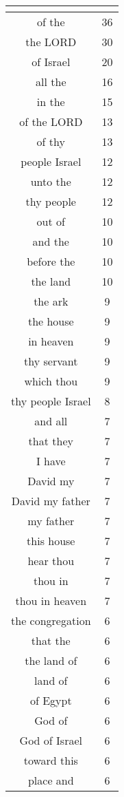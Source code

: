 \begin{center}
\begin{longtable}{|c|c|}
\hline \multicolumn{2}{c}{{ }} \\ \hline
\endfoot 
of the & 36\\ \hline 
the LORD & 30\\ \hline 
of Israel & 20\\ \hline 
all the & 16\\ \hline 
in the & 15\\ \hline 
of the LORD & 13\\ \hline 
of thy & 13\\ \hline 
people Israel & 12\\ \hline 
unto the & 12\\ \hline 
thy people & 12\\ \hline 
out of & 10\\ \hline 
and the & 10\\ \hline 
before the & 10\\ \hline 
the land & 10\\ \hline 
the ark & 9\\ \hline 
the house & 9\\ \hline 
in heaven & 9\\ \hline 
thy servant & 9\\ \hline 
which thou & 9\\ \hline 
thy people Israel & 8\\ \hline 
and all & 7\\ \hline 
that they & 7\\ \hline 
I have & 7\\ \hline 
David my & 7\\ \hline 
David my father & 7\\ \hline 
my father & 7\\ \hline 
this house & 7\\ \hline 
hear thou & 7\\ \hline 
thou in & 7\\ \hline 
thou in heaven & 7\\ \hline 
the congregation & 6\\ \hline 
that the & 6\\ \hline 
the land of & 6\\ \hline 
land of & 6\\ \hline 
of Egypt & 6\\ \hline 
God of & 6\\ \hline 
God of Israel & 6\\ \hline 
toward this & 6\\ \hline 
place and & 6\\ \hline 

\end{longtable}
\end{center}
